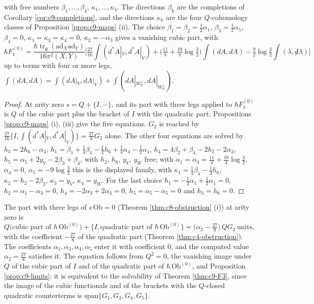 \begin{theorem}
\[\]
with free numbers $\beta_1,\dots,\beta_4$, $\kappa_1,\dots,\kappa_4$. The directions $\beta_k$ are the completions of Corollary \ref{cor:c9-completions}, and the directions $\kappa_k$ are the four $Q$-cohomology classes of Proposition \ref{prop:c9-maps} (ii). The choice $\beta_1=\beta_2=\tfrac12\alpha_1$, $\beta_3=\tfrac12\alpha_5$, $\beta_4=0$, $\kappa_1=\kappa_3=\kappa_4=0$, $\kappa_2=-\alpha_3$ gives a vanishing cubic part, with
\begin{equation}
\hbar F_1^{(0)}=\frac{\hbar\operatorname{tr}_{\mathfrak g}(\mathrm{ad}_X\mathrm{ad}_Y)}{16\pi^2(X,Y)}\Big[\tfrac{27}{16}\int(d^*A|_V,d^*A|_V)+\big(\tfrac{11}8+\tfrac{19}8\log\tfrac32\big)\int(dA,dA)-\tfrac92\log\tfrac32\int(\lambda,{\not d}\lambda)\Big]
\label{eq:c9-F2rep}
\end{equation}
up to terms with four or more legs, $\int(dA,dA)=\int(dA|_V,dA|_V)+\int(dA|_{W_{\mathbb R}^\perp},dA|_{W_{\mathbb R}^\perp})$.
\end{theorem}

\begin{proof}
At arity zero $s=Q+\{I,-\}$, and its part with three legs applied to $\hbar F_1^{(0)}$ is $Q$ of the cubic part plus the bracket of $I$ with the quadratic part; Propositions \ref{prop:c9-maps} (i), (iii) give the five equations. $G_2$ is reached by $\tfrac{27}{16}\{I,\int(d^*A|_V,d^*A|_V)\}=\tfrac{27}8G_2$ alone. The other four equations are solved by $h_3=2h_6-\alpha_4$, $h_1=\beta_1+\tfrac14\beta_4-\tfrac12h_6+\tfrac14\alpha_4-\tfrac12\alpha_1$, $h_4=4\beta_2+\beta_4-2h_2-2\alpha_3$, $h_5=\alpha_5+2y_V-2\beta_3+\beta_4$, with $h_2$, $h_6$, $y_V$, $y_W$ free; with $\alpha_1=\alpha_3=\tfrac{11}4+\tfrac{19}4\log\tfrac32$, $\alpha_4=0$, $\alpha_5=-9\log\tfrac32$ this is the displayed family, with $\kappa_1=\tfrac14\beta_4-\tfrac12h_6$, $\kappa_2=h_2-2\beta_2$, $\kappa_3=y_V$, $\kappa_4=y_W$. For the last choice $h_1=-\tfrac12\alpha_1+\tfrac12\alpha_1=0$, $h_2=\alpha_1-\alpha_3=0$, $h_4=-2\alpha_3+2\alpha_3=0$, $h_5=\alpha_5-\alpha_5=0$ and $h_3=h_6=0$.
\end{proof}

\begin{theorem}
\label{thm:c9-wz}
The part with three legs of $s\,\mathrm{Ob}=0$ (Theorem \ref{thm:c8-obstruction} (i)) at arity zero is
\[
Q\big(\text{cubic part of }\hbar\,\mathrm{Ob}^{(0)}\big)+\big\{I,\text{quadratic part of }\hbar\,\mathrm{Ob}^{(0)}\big\}=\big(\alpha_2-\tfrac{27}8\big)\,QG_2\ \text{units},
\]
with the coefficient $-\tfrac{27}8$ of the quadratic part (Theorem \ref{thm:c4-obstruction}). The coefficients $\alpha_1,\alpha_3,\alpha_4,\alpha_5$ enter it with coefficient $0$, and the computed value $\alpha_2=\tfrac{27}8$ satisfies it. The equation follows from $Q^2=0$, the vanishing image under $Q$ of the cubic part of $I$ and of the quadratic part of $\hbar\,\mathrm{Ob}^{(0)}$, and Proposition \ref{prop:c9-limits}; it is equivalent to the solvability of Theorem \ref{thm:c9-F3}, since the image of the cubic functionals and of the brackets with the $Q$-closed quadratic counterterms is $\mathrm{span}\{G_1,G_3,G_4,G_5\}$.
\end{theorem}

